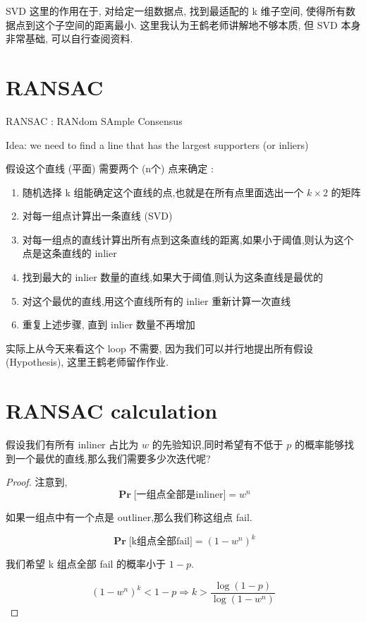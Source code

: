 \documentclass[lang=cn,10pt,green]{elegantbook}
\begin{document}
SVD 这里的作用在于, 对给定一组数据点, 找到最适配的 k 维子空间, 使得所有数据点到这个子空间的距离最小. 这里我认为王鹤老师讲解地不够本质, 但 SVD 本身非常基础, 可以自行查阅资料.

\newpage
\section{RANSAC}


RANSAC : RANdom SAmple Consensus

Idea: we need to ﬁnd a line that has the largest supporters (or inliers)

\begin{definition}
    假设这个直线 (平面) 需要两个 (n个) 点来确定 : 

    \begin{enumerate}
        \item 随机选择 k 组能确定这个直线的点,也就是在所有点里面选出一个 $k\times 2$ 的矩阵
        \item 对每一组点计算出一条直线 (SVD)
        \item 对每一组点的直线计算出所有点到这条直线的距离,如果小于阈值,则认为这个点是这条直线的 inlier
        \item 找到最大的 inlier 数量的直线,如果大于阈值,则认为这条直线是最优的
        \item 对这个最优的直线,用这个直线所有的 inlier 重新计算一次直线
        \item 重复上述步骤, 直到 inlier 数量不再增加
    \end{enumerate}
    
\end{definition}
\begin{note}
    实际上从今天来看这个 loop 不需要, 因为我们可以并行地提出所有假设 (Hypothesis), 这里王鹤老师留作作业.
\end{note}

\section{RANSAC calculation}
\begin{problem}
假设我们有所有 inliner 占比为 $w$ 的先验知识,同时希望有不低于 $p$ 的概率能够找到一个最优的直线,那么我们需要多少次迭代呢?
\end{problem}
\begin{proof}
注意到, 
\begin{equation}
\mathbf{\Pr}\text{[一组点全部是inliner]} = w^n
\end{equation}

如果一组点中有一个点是 outliner,那么我们称这组点 fail.

\begin{equation}
\mathbf{\Pr}\text{[k组点全部fail]} = {(1-w^n)}^k
\end{equation}

我们希望 k 组点全部 fail 的概率小于 $1-p$.

\begin{equation}
{(1-w^{n})}^k < 1-p
\Rightarrow
k > \frac{\log(1-p)}{\log(1-w^n)}
\end{equation}
\end{proof}
\end{document}
